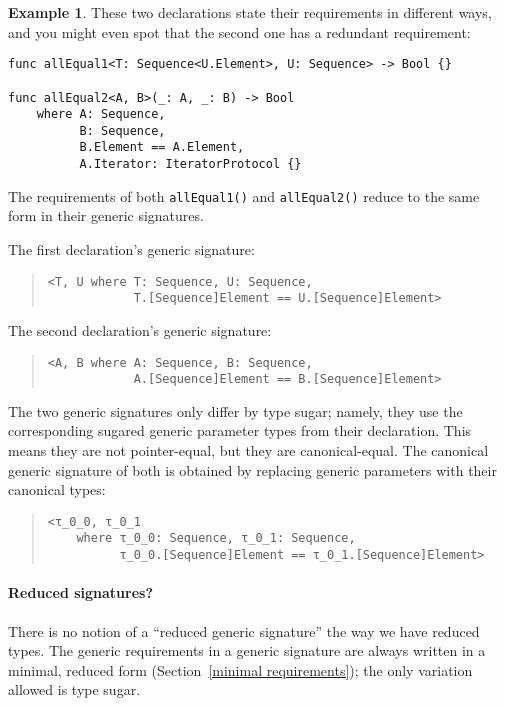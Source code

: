\documentclass[a4paper,headsepline,bibliography=totoc,toc=flat,fleqn,twoside=semi]{scrbook}
\theoremstyle{definition}
\theoremstyle{definition}
\newtheorem{example}{Example}[chapter]
\theoremstyle{definition}
\begin{document}
\begin{example}
These two declarations state their requirements in different ways, and you might even spot that the second one has a redundant requirement:
\begin{Verbatim}
func allEqual1<T: Sequence<U.Element>, U: Sequence> -> Bool {}

func allEqual2<A, B>(_: A, _: B) -> Bool
    where A: Sequence,
          B: Sequence,
          B.Element == A.Element,
          A.Iterator: IteratorProtocol {}
\end{Verbatim}
The requirements of both \texttt{allEqual1()} and \texttt{allEqual2()} reduce to the same form in their generic signatures.

The first declaration's generic signature:
\begin{quote}
\begin{verbatim}
<T, U where T: Sequence, U: Sequence,
            T.[Sequence]Element == U.[Sequence]Element>
\end{verbatim}
\end{quote}

The second declaration's generic signature:
\begin{quote}
\begin{verbatim}
<A, B where A: Sequence, B: Sequence,
            A.[Sequence]Element == B.[Sequence]Element>
\end{verbatim}
\end{quote}
The two generic signatures only differ by type sugar; namely, they use the corresponding sugared generic parameter types from their declaration. This means they are not pointer-equal, but they are canonical-equal. The canonical generic signature of both is obtained by replacing generic parameters with their canonical types:
\begin{quote}
\begin{verbatim}
<τ_0_0, τ_0_1
    where τ_0_0: Sequence, τ_0_1: Sequence,
          τ_0_0.[Sequence]Element == τ_0_1.[Sequence]Element>
\end{verbatim}
\end{quote}
\end{example}

\paragraph{Reduced signatures?}
There is no notion of a ``reduced generic signature'' the way we have reduced types. The generic requirements in a generic signature are always written in a minimal, reduced form (Section~\ref{minimal requirements}); the only variation allowed is type sugar.
\end{document}
